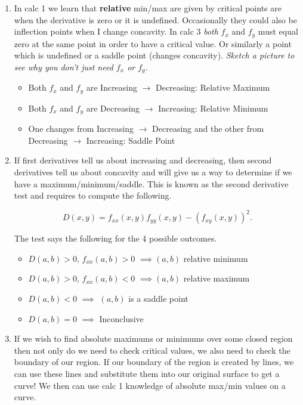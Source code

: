 \documentclass[11pt]{article}
\begin{document}
\begin{enumerate}
\item In calc 1 we learn that \textbf{relative} min/max are given by critical points are when the derivative is zero or it is undefined. Occasionally they could also be inflection points when I change concavity. In calc 3 \emph{both} $f_x$ and $f_y$ must equal zero at the same point in order to have a critical value. Or similarly a point which is undefined or a saddle point (changes concavity). \emph{Sketch a picture to see why you don't just need $f_x$ or $f_y$}.

\begin{itemize}
    \item Both $f_x$ and $f_y$ are Increasing $\to$ Decreasing: Relative Maximum
    \item Both $f_x$ and $f_y$ are Decreasing $\to$ Increasing: Relative Minimum
    \item One changes from Increasing $\to$ Decreasing and the other from Decreasing $\to$ Increasing: Saddle Point
\end{itemize}

\item If first derivatives tell us about increasing and decreasing, then second derivatives tell us about concavity and will give us a way to determine if we have a maximum/minimum/saddle. This is known as the second derivative test and requires to compute the following.

\begin{equation*}
    D(x,y) = f_{xx}(x,y)f_{yy}(x,y) - (f_{xy}(x,y))^2.
\end{equation*}

The test says the following for the 4 possible outcomes.

\begin{itemize}
    \item $D(a,b) > 0$, $f_{xx}(a,b) >0$ $\implies (a,b)$ relative minimum
    \item $D(a,b) > 0$, $f_{xx}(a,b) <0$ $\implies (a,b)$ relative maximum
    \item $D(a,b) < 0 $ $\implies$ $(a,b)$ is a saddle point
    \item $D(a,b) = 0$  $\implies$ Inconclusive
\end{itemize}

\item If we wish to find absolute maximums or minimums over some closed region then not only do we need to check critical values, we also need to check the boundary of our region. If our boundary of the region is created by lines, we can use these lines and substitute them into our original surface to get a curve! We then can use calc 1 knowledge of absolute max/min values on a curve.


\end{enumerate}
\end{document}
